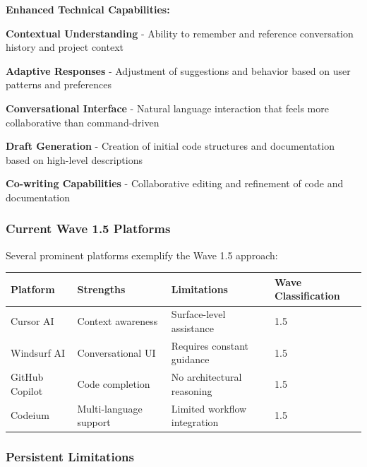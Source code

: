 \textbf{Enhanced Technical Capabilities:}

\begin{expandedlist}
    \item \textbf{Contextual Understanding} - Ability to remember and reference conversation history and project context
    
    \item \textbf{Adaptive Responses} - Adjustment of suggestions and behavior based on user patterns and preferences
    
    \item \textbf{Conversational Interface} - Natural language interaction that feels more collaborative than command-driven
    
    \item \textbf{Draft Generation} - Creation of initial code structures and documentation based on high-level descriptions
    
    \item \textbf{Co-writing Capabilities} - Collaborative editing and refinement of code and documentation
\end{expandedlist}

\subsubsection{Current Wave 1.5 Platforms}

Several prominent platforms exemplify the Wave 1.5 approach:

\begin{center}
\begin{tabular}{@{}llll@{}}
\toprule
\textbf{Platform} & \textbf{Strengths} & \textbf{Limitations} & \textbf{Wave Classification} \\
\midrule
Cursor AI & Context awareness & Surface-level assistance & 1.5 \\
Windsurf AI & Conversational UI & Requires constant guidance & 1.5 \\
GitHub Copilot & Code completion & No architectural reasoning & 1.5 \\
Codeium & Multi-language support & Limited workflow integration & 1.5 \\
\bottomrule
\end{tabular}
\label{tab:wave15-platforms}
\end{center}

\subsubsection{Persistent Limitations}

